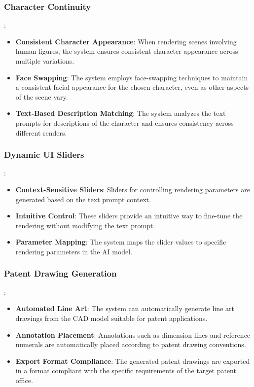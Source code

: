 \documentclass{article}
\begin{document}
\begin{itemize}
\subsubsection{Character Continuity}:
\begin{itemize}
    \item \textbf{Consistent Character Appearance}: When rendering scenes involving human figures, the system ensures consistent character appearance across multiple variations.
    \item \textbf{Face Swapping}: The system employs face-swapping techniques to maintain a consistent facial appearance for the chosen character, even as other aspects of the scene vary.
    \item \textbf{Text-Based Description Matching}: The system analyzes the text prompts for descriptions of the character and ensures consistency across different renders.
\end{itemize}

\subsubsection{Dynamic UI Sliders}:
\begin{itemize}
    \item \textbf{Context-Sensitive Sliders}: Sliders for controlling rendering parameters are generated based on the text prompt context.
    \item \textbf{Intuitive Control}: These sliders provide an intuitive way to fine-tune the rendering without modifying the text prompt.
    \item \textbf{Parameter Mapping}: The system maps the slider values to specific rendering parameters in the AI model.
\end{itemize}

\subsubsection{Patent Drawing Generation}:
\begin{itemize}
    \item \textbf{Automated Line Art}: The system can automatically generate line art drawings from the CAD model suitable for patent applications.
    \item \textbf{Annotation Placement}: Annotations such as dimension lines and reference numerals are automatically placed according to patent drawing conventions.
    \item \textbf{Export Format Compliance}: The generated patent drawings are exported in a format compliant with the specific requirements of the target patent office.
\end{itemize}


\end{itemize}
\end{document}
